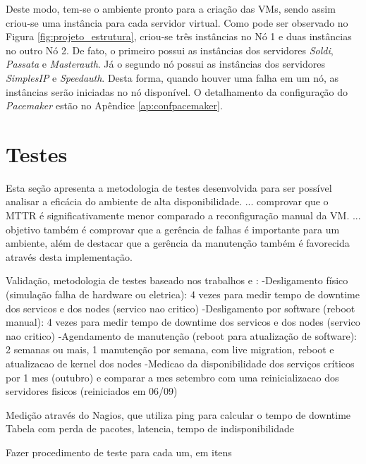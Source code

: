 
Deste modo, tem-se o ambiente pronto para a criação das \acp{VM}, sendo assim criou-se uma instância para cada servidor virtual. 
Como pode ser observado no Figura \ref{fig:projeto_estrutura}, criou-se três instâncias no Nó 1 e duas instâncias no outro Nó 2. De fato, o 
primeiro possui as instâncias dos servidores \textit{Soldi}, \textit{Passata} e \textit{Masterauth}. Já o segundo nó possui as instâncias dos 
servidores \textit{SimplesIP} e \textit{Speedauth}. Desta forma, quando houver uma falha em um nó, as instâncias serão iniciadas no nó disponível.
O detalhamento da configuração do \textit{Pacemaker} estão no Apêndice \ref{ap:confpacemaker}.


\section{Testes}
\label{section:testes}

Esta seção apresenta a metodologia de testes desenvolvida para ser possível analisar a eficácia do ambiente de alta disponibilidade.
... comprovar que o \ac{MTTR} é significativamente menor comparado a reconfiguração manual da \ac{VM}.
... objetivo também é comprovar que a gerência de falhas é importante para um ambiente, além de destacar que a gerência da manutenção também é 
favorecida através desta implementação.


Validação, metodologia de testes baseado nos trabalhos \cite{reis2009} e \cite{goncalves2009}:
-Desligamento físico (simulação falha de hardware ou eletrica): 4 vezes para medir tempo de downtime dos servicos e dos nodes (servico nao critico)
-Desligamento por software (reboot manual): 4 vezes para medir tempo de downtime dos servicos e dos nodes (servico nao critico)
-Agendamento de manutenção (reboot para atualização de software): 2 semanas ou mais, 1 manutenção por semana, com live migration, reboot e 
atualizacao de kernel dos nodes
-Medicao da disponibilidade dos serviços críticos por 1 mes (outubro) e comparar a mes setembro com uma reinicializacao dos servidores fisicos (reiniciados em 06/09)

Medição através do Nagios, que utiliza ping para calcular o tempo de downtime
Tabela com perda de pacotes, latencia, tempo de indisponibilidade

Fazer procedimento de teste para cada um, em itens

